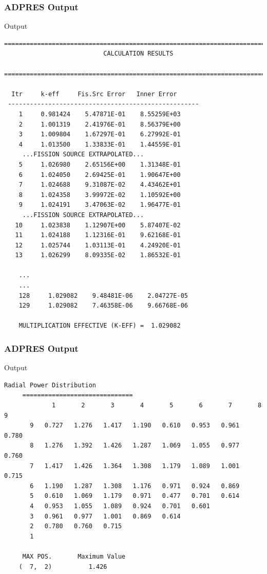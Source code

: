 \documentclass{beamer}
\begin{document}

\begin{frame}[fragile] %
\frametitle{ADPRES Output}
\begin{block}{Output}
\begin{Verbatim}[fontsize=\tiny]
  ==============================================================================
                           CALCULATION RESULTS
  ==============================================================================

  Itr     k-eff     Fis.Src Error   Inner Error
 ----------------------------------------------------
    1     0.981424    5.47871E-01    8.55259E+03
    2     1.001319    2.41976E-01    8.56379E+00
    3     1.009804    1.67297E-01    6.27992E-01
    4     1.013500    1.33833E-01    1.44559E-01
     ...FISSION SOURCE EXTRAPOLATED...
    5     1.026980    2.65156E+00    1.31348E-01
    6     1.024050    2.69425E-01    1.90647E+00
    7     1.024688    9.31087E-02    4.43462E+01
    8     1.024358    3.99972E-02    1.10592E+00
    9     1.024191    3.47063E-02    1.96477E-01
     ...FISSION SOURCE EXTRAPOLATED...
   10     1.023838    1.12907E+00    5.87407E-02
   11     1.024188    1.12316E-01    9.62168E-01
   12     1.025744    1.03113E-01    4.24920E-01
   13     1.026299    8.09335E-02    1.86532E-01

    ...
    ...
    128     1.029082    9.48481E-06    2.04727E-05
    129     1.029082    7.46358E-06    9.66768E-06

    MULTIPLICATION EFFECTIVE (K-EFF) =  1.029082
\end{Verbatim}
\end{block}
\end{frame}


\begin{frame}[fragile] %
\frametitle{ADPRES Output}
\begin{block}{Output}
\begin{Verbatim}[fontsize=\tiny]
       Radial Power Distribution
     ==============================
             1       2       3       4       5       6       7       8       9
       9   0.727   1.276   1.417   1.190   0.610   0.953   0.961   0.780
       8   1.276   1.392   1.426   1.287   1.069   1.055   0.977   0.760
       7   1.417   1.426   1.364   1.308   1.179   1.089   1.001   0.715
       6   1.190   1.287   1.308   1.176   0.971   0.924   0.869
       5   0.610   1.069   1.179   0.971   0.477   0.701   0.614
       4   0.953   1.055   1.089   0.924   0.701   0.601
       3   0.961   0.977   1.001   0.869   0.614
       2   0.780   0.760   0.715
       1

     MAX POS.       Maximum Value
    (  7,  2)          1.426
\end{Verbatim}
\end{block}
\end{frame}
\end{document}
